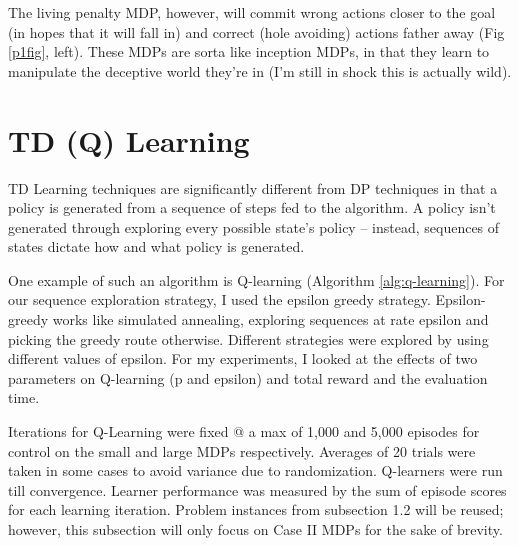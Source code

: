 \documentclass[letter]{article}
\begin{document}
The living penalty MDP, however, will commit wrong actions closer to the goal (in hopes that it will fall in) and correct (hole avoiding) actions father away (Fig \ref{p1fig}, left). These MDPs are sorta like inception MDPs, in that they learn to manipulate the deceptive world they're in (I'm still in shock this is actually wild).

\section{TD (Q) Learning}
TD Learning techniques are significantly different from DP techniques in that a policy is generated from a sequence of steps fed to the algorithm. A policy isn't generated through exploring every possible state's policy -- instead, sequences of states dictate how and what policy is generated.

One example of such an algorithm is Q-learning (Algorithm \ref{alg:q-learning}). For our sequence exploration strategy, I used the epsilon greedy strategy. Epsilon-greedy works like simulated annealing, exploring sequences at rate epsilon and picking the greedy route otherwise. Different strategies were explored by using different values of epsilon. For my experiments, I looked at the effects of two parameters on Q-learning (p and epsilon) and total reward and the evaluation time. 

Iterations for Q-Learning were fixed @ a max of 1,000 and 5,000 episodes for control on the small and large MDPs respectively. Averages of 20 trials were taken in some cases to avoid variance due to randomization. Q-learners were run till convergence. Learner performance was measured by the sum of episode scores for each learning iteration. Problem instances from subsection 1.2 will be reused; however, this subsection will only focus on Case II MDPs for the sake of brevity.
 
\end{document}
